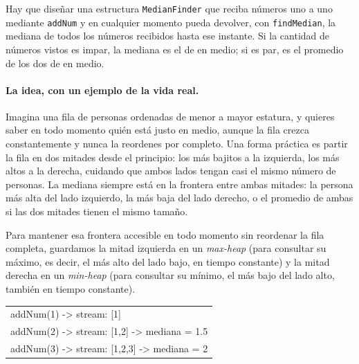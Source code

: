 
Hay que diseñar una estructura \texttt{MedianFinder} que reciba números uno a
uno mediante \texttt{addNum} y en cualquier momento pueda devolver, con
\texttt{findMedian}, la mediana de todos los números recibidos hasta ese
instante. Si la cantidad de números vistos es impar, la mediana es el de en
medio; si es par, es el promedio de los dos de en medio.

\paragraph{La idea, con un ejemplo de la vida real.} Imagina una fila de
personas ordenadas de menor a mayor estatura, y quieres saber en todo
momento quién está justo en medio, aunque la fila crezca constantemente y
nunca la reordenes por completo. Una forma práctica es partir la fila en dos
mitades desde el principio: los más bajitos a la izquierda, los más altos a
la derecha, cuidando que ambos lados tengan casi el mismo número de
personas. La mediana siempre está en la frontera entre ambas mitades: la
persona más alta del lado izquierdo, la más baja del lado derecho, o el
promedio de ambas si las dos mitades tienen el mismo tamaño.

Para mantener esa frontera accesible en todo momento sin reordenar la fila
completa, guardamos la mitad izquierda en un \emph{max-heap} (para consultar
su máximo, es decir, el más alto del lado bajo, en tiempo constante) y la
mitad derecha en un \emph{min-heap} (para consultar su mínimo, el más bajo
del lado alto, también en tiempo constante).

\begin{center}
\ttfamily
\begin{tabular}{l}
addNum(1) -> stream: [1]\\
addNum(2) -> stream: [1,2] -> mediana = 1.5\\
addNum(3) -> stream: [1,2,3] -> mediana = 2\\
\end{tabular}
\end{center}


